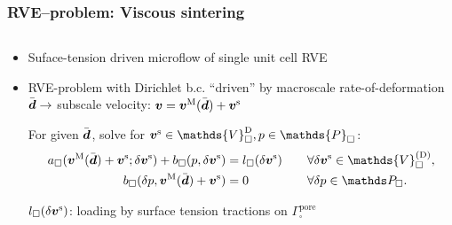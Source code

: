 \documentclass[11pt,mathserif]{beamer}
\begin{document}
\newcommand{\macroscale}{\mathrm{M}}
\newcommand{\subscale}{\mathrm{s}}
\begin{frame}
 \frametitle{RVE--problem: Viscous sintering}
 \begin{center}
  \begin{columns}
   \centering
    \resizebox{!}{0.8\textwidth}{}
   \centering
    \resizebox{!}{0.8\textwidth}{}
  \end{columns}
 \end{center}
 \begin{itemize}
  \item Suface-tension driven microflow of single unit cell RVE
  \item RVE-problem with Dirichlet b.c. ``driven'' by macroscale rate-of-deformation $\bar{\text{\boldmath $d$}}\rightarrow$ subscale velocity:
	$\ts v = \ts v^\macroscale(\bar{\ts d})+\ts v^\subscale$

 For given $\bar{\text{\boldmath $d$}}$, solve for $\ts v^\subscale \in \mathds{V}_\square^{\mathrm{D}}, p \in \mathds{P}_\square$:
 \begin{align*}
  a_\square(\ts v^\macroscale(\bar{\ts d})+\ts v^\subscale; \delta\ts v^\subscale) + b_\square(p,\delta \ts v^\subscale) &= l_\square(\delta \ts v^\subscale)\quad &&\forall \delta \ts v^\subscale \in \mathds{V}_\square^{(\mathrm{D})},\\
 b_\square(\delta p,\ts v^\macroscale(\bar{\ts d}) + \ts v^\subscale) &= 0 && \forall \delta p\in \mathds P_\square.
 \end{align*}

 $l_\square(\delta \ts v^\subscale)$: loading by surface tension tractions on $\Gamma_\square^{\text{pore}}$
 \end{itemize}


\end{frame}
\end{document}
